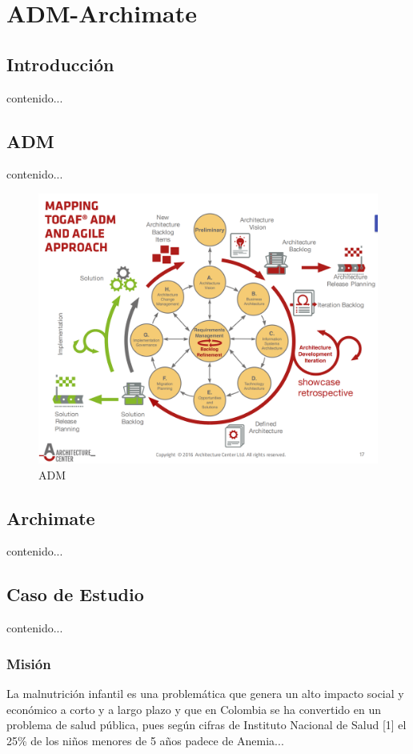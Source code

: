 \chapter{ADM-Archimate}
\section{Introducción}
contenido...
\newpage

\section{ADM}
contenido...

\begin{figure}[h!]
	\centering
	\includegraphics[width=0.7\linewidth]{ARQUITECTURA/imgs/adm}
	\caption{ADM \cite{SB,1579133,6337726,6337730,6827125}}
\end{figure}


\newpage

\section{Archimate}
contenido...

\newpage

\section{Caso de Estudio}
contenido...

\subsection{Misión}
La malnutrición infantil es una problemática que genera un alto impacto social y económico a corto y a largo plazo y que en Colombia se ha convertido en un problema de salud pública, pues según cifras de Instituto Nacional de Salud [1] el 25\% de los niños menores de 5 años padece de Anemia...
